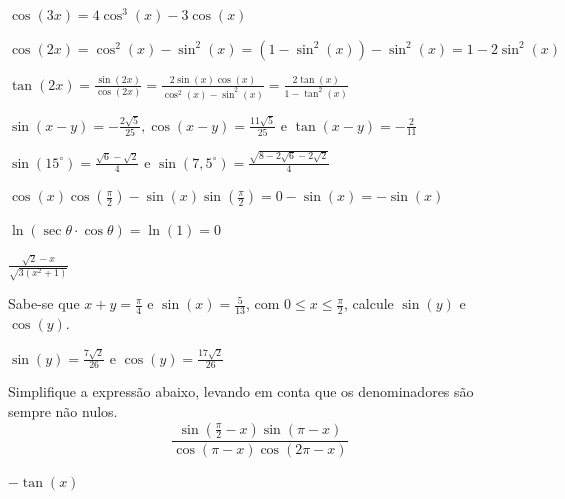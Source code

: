 \begin{exercises*}
\begin{exercise}
  \begin{answer}
    \begin{alphalist}
      \item $\cos(3x) = 4\cos^3(x) - 3\cos(x)$
      \item $\cos(2x) = \cos^2(x) - \sin^2(x) = (1 - \sin^2(x)) - \sin^2(x) = 1
            - 2\sin^2(x)$
      \item $\tan(2x) = \frac{\sin(2x)}{\cos(2x)} =
            \frac{2\sin(x)\cos(x)}{\cos^2(x) - \sin^2(x)} = \frac{2\tan(x)}{1 -
            \tan^2(x)}$
      \item $\sin(x-y) = -\frac{2\sqrt{5}}{25}, \cos(x-y) =
            \frac{11\sqrt{5}}{25}$ e $\tan(x-y) = -\frac{2}{11}$
      \item $\sin(15^{\circ}) = \frac{\sqrt{6}-\sqrt{2}}{4}$ e
            $\sin(7,5^{\circ}) = \frac{\sqrt{8-2\sqrt{6}-2\sqrt{2}}}{4}$
      \item $\cos(x)\cos\left(\frac{\pi}{2}\right) -
            \sin(x)\sin\left(\frac{\pi}{2}\right) = 0 - \sin(x) = -\sin(x)$
      \item $\ln(\sec\theta \cdot \cos\theta) = \ln(1) = 0$
      \item $\frac{\sqrt{2}-x}{\sqrt{3(x^2+1)}}$
    \end{alphalist}
  \end{answer}
\end{exercise}

\begin{exercise}
  Sabe-se que $x + y = \frac{\pi}{4}$ e $\sin(x) = \frac{5}{13}$, com
  $0 \leq x \leq \frac{\pi}{2}$, calcule $\sin(y)$ e $\cos(y)$.

  \begin{answer}
    $\sin(y)=\frac{7\sqrt{2}}{26}$ e $\cos(y)=\frac{17\sqrt{2}}{26}$
  \end{answer}
\end{exercise}

\begin{exercise}
  Simplifique a expressão abaixo, levando em conta que os denominadores
  são sempre não nulos.
  \[\frac{\sin(\frac{\pi}{2}-x)\sin(\pi-x)}{\cos(\pi-x)\cos(2\pi-x)}\]

  \begin{answer}
    $-\tan(x)$
  \end{answer}
\end{exercise}


\end{exercises*}
